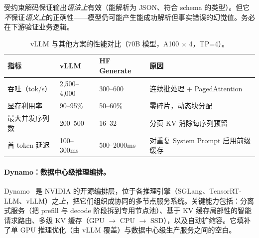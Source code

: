 \begin{warningbox}[结构化输出 $\neq$ 正确输出]
受约束解码保证输出\emph{语法上}有效（能解析为 JSON、符合 schema 的类型）。但它\emph{不}保证\emph{语义上}的正确性——模型仍可能产生能成功解析但事实错误的幻觉值。务必在下游验证业务逻辑。
\end{warningbox}

\begin{table}[ht!]
\centering\small
\caption{vLLM 与其他方案的性能对比（70B 模型，A100 $\times$ 4，TP=4）。}
\noindent\begin{tabularx}{\linewidth}{@{}l Z{0.61} Z{0.6} Z{1.79}@{}}
\toprule
\textbf{指标} & \textbf{vLLM} & \textbf{HF Generate} & \textbf{原因} \\
\midrule
吞吐（tok/s） & 2,500--4,000 & 300--600 & 连续批处理 + PagedAttention \\
显存利用率 & 90--95\% & 50--60\% & 零碎片，动态块分配 \\
最大并发序列数 & 200--500 & 16--32 & 分页 KV 消除每序列预留 \\
首 token 延迟 & 100--300ms & 500--2000ms & 对重复 System Prompt 启用前缀缓存 \\
\bottomrule
\end{tabularx}
\end{table}

\paragraph{Dynamo：数据中心级推理编排。}
Dynamo~\cite{dynamo2025nvidia} 是 NVIDIA 的开源编排层，位于各推理引擎（SGLang、TensorRT-LLM、vLLM）之\emph{上}，把它们组织成协同的多节点服务系统。关键能力包括：分离式服务（把 prefill 与 decode 阶段拆到专用节点池）、基于 KV 缓存局部性的智能请求路由、多级 KV 缓存（GPU $\to$ CPU $\to$ SSD），以及自动扩缩容。它填补了单 GPU 推理优化（由 vLLM 覆盖）与数据中心级生产服务之间的空白。

